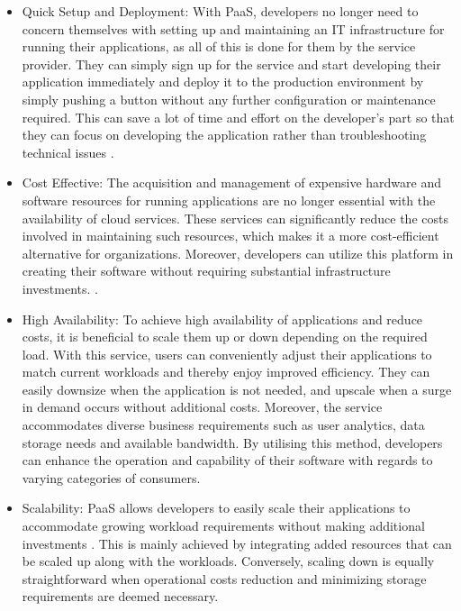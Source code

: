 \documentclass[BIF,Bachelor,nenglish]{twbook}%
\begin{document}
\begin{itemize}
\item Quick Setup and Deployment: With PaaS, developers no longer need to concern themselves with setting up and maintaining an IT infrastructure for running their applications, as all of this is done for them by the service provider. They can simply sign up for the service and start developing their application immediately and deploy it to the production environment by simply pushing a button without any further configuration or maintenance required. This can save a lot of time and effort on the developer's part so that they can focus on developing the application rather than troubleshooting technical issues \cite{law2008}.

\item Cost Effective: The acquisition and management of expensive hardware and software resources for running applications are no longer essential with the availability of cloud services. These services can significantly reduce the costs involved in maintaining such resources, which makes it a more cost-efficient alternative for organizations. Moreover, developers can utilize this platform in creating their software without requiring substantial infrastructure investments. \cite{gai2014}.

\item High Availability: To achieve high availability of applications and reduce costs, it is beneficial to scale them up or down depending on the required load. With this service, users can conveniently adjust their applications to match current workloads and thereby enjoy improved efficiency. They can easily downsize when the application is not needed, and upscale when a surge in demand occurs without additional costs. Moreover, the service accommodates diverse business requirements such as user analytics, data storage needs and available bandwidth. By utilising this method, developers can enhance the operation and capability of their software with regards to varying categories of consumers.

\item Scalability: PaaS allows developers to easily scale their applications to accommodate growing workload requirements without making additional investments \cite{law2008}. This is mainly achieved by integrating added resources that can be scaled up along with the workloads. Conversely, scaling down is equally straightforward when operational costs reduction and minimizing storage requirements are deemed necessary.
\end{itemize}
\end{document}

